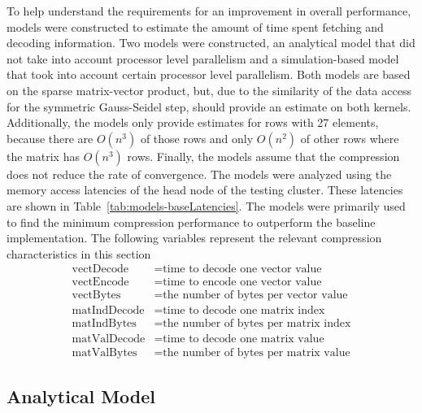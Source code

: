 
To help understand the requirements for an improvement in overall performance, models were constructed to estimate the amount of time spent fetching and decoding information.
Two models were constructed, an analytical model that did not take into account processor level parallelism and a simulation-based model that took into account certain processor level parallelism.
Both models are based on the sparse matrix-vector product, but, due to the similarity of the data access for the symmetric Gauss-Seidel step, should provide an estimate on both kernels.
Additionally, the models only provide estimates for rows with 27 elements, because there are \(O(n^3)\) of those rows and only \(O(n^2)\) of other rows where the matrix has \(O(n^3)\) rows.
Finally, the models assume that the compression does not reduce the rate of convergence.
The models were analyzed using the memory access latencies of the head node of the testing cluster.
These latencies are shown in Table~\ref{tab:models-baseLatencies}.
The models were primarily used to find the minimum compression performance to outperform the baseline implementation.
The following variables represent the relevant compression characteristics in this section
\begin{align*}
	\mathrm{vectDecode} &= \text{time to decode one vector value} \\
	\mathrm{vectEncode}  &= \text{time to encode one vector value} \\
	\mathrm{vectBytes} &= \text{the number of bytes per vector value} \\
	\mathrm{matIndDecode} &= \text{time to decode one matrix index} \\
	\mathrm{matIndBytes} &= \text{the number of bytes per matrix index} \\
	\mathrm{matValDecode} &= \text{time to decode one matrix value} \\
	\mathrm{matValBytes} &= \text{the number of bytes per matrix value}
\end{align*}




\subsection{Analytical Model}

